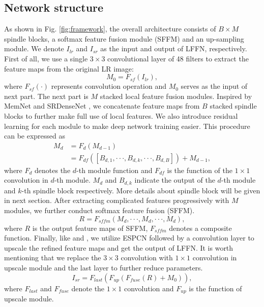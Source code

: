 \documentclass[journal]{IEEEtran}
\begin{document}
\subsection{Network structure}
As shown in Fig. \ref{fig:framework}, the overall architecture consists of $B\times M$ spindle blocks, a softmax feature fusion module (SFFM) and an up-sampling module. We denote $I_{lr}$ and $I_{sr}$ as the input and output of LFFN, respectively. First of all, we use a single $3\times 3$ convolutional layer of 48 filters to extract the feature maps from the original LR image:
\begin{equation}
M_{0}=F_{sf}(I_{lr}),
\label{first_layer}
\end{equation}
where $F_{sf}(\cdot)$ represents convolution operation and $M_{0}$ serves as the input of next part. The next part is $M$ stacked local feature fusion modules. Inspired by MemNet \cite{tai2017memnet} and SRDenseNet \cite{tong2017image}, we concatenate feature maps from $B$ stacked spindle blocks to further make full use of local features. We also introduce residual learning for each module to make deep network training easier. This procedure can be expressed as
\begin{equation}
\begin{aligned}
M_{d}&=F_{d}(M_{d-1})\\
&=F_{df}([B_{d,1},\cdot \cdot \cdot ,B_{d,k},\cdot \cdot \cdot ,B_{d,B}])+M_{d-1},
\end{aligned}
\label{module}
\end{equation}
where $F_{d}$ denotes the $d$-th module function and $F_{df}$ is the function of the $1\times 1$ convolution in $d$-th module. $M_{d}$ and $B_{d,k}$ indicate the output of the $d$-th module and $k$-th spindle block respectively. More details about spindle block will be given in next section. After extracting complicated features progressively with $M$ modules, we further conduct softmax feature fusion (SFFM).
\begin{equation}
R=F_{sffm}(M_{d},\cdot \cdot \cdot ,M_{d},\cdot \cdot \cdot ,M_{d}),
\label{softmax_1}
\end{equation}
where $R$ is the output feature maps of SFFM, $F_{sffm}$ denotes a composite function. Finally, like\cite{ledig2017photo} and \cite{lim2017enhanced} , we utilize ESPCN \cite{shi2016real} followed by a convolution layer to upscale the refined feature maps and get the output of LFFN. It is worth mentioning that we replace the $3\times 3$ convolution with $1\times 1$ convolution in upscale module and the last layer to further reduce parameters.
\begin{equation}
I_{sr}=F_{last}(F_{up}(F_{fuse}(R)+M_{0})),
\label{result_equation}
\end{equation}
where $F_{last}$ and $F_{fuse}$ denote the $1\times 1$ convolution and $F_{up}$ is the function of upscale module.
\end{document}
